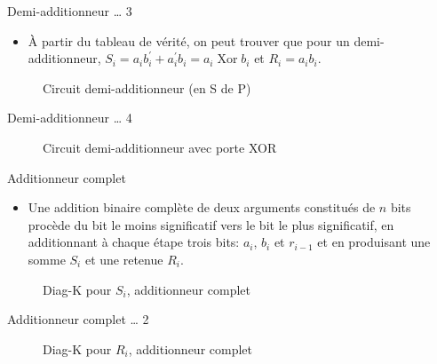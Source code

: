 \documentclass[presentation]{beamer}
\begin{document}
\begin{frame}[label={sec:orgcc94cd7}]{Demi-additionneur \ldots{} 3}
\begin{itemize}
\item À partir du tableau de vérité, on peut trouver que pour un demi-additionneur, \(S_{i} = a_i b_i^\prime + a_i^\prime b_i = a_i \operatorname{Xor} b_i\) et \(R_{i} = a_i b_i\).
\end{itemize}

\begin{figure}[htbp]
\centering

\caption{\label{fig:org5fc7bf9}Circuit demi-additionneur (en S de P)}
\end{figure}
\end{frame}

\begin{frame}[label={sec:orgd9187c1}]{Demi-additionneur \ldots{} 4}
\begin{figure}[htbp]
\centering

\caption{\label{fig:org9df32d8}Circuit demi-additionneur avec porte XOR}
\end{figure}
\end{frame}

\begin{frame}[label={sec:org1e5f91c}]{Additionneur complet}
\begin{itemize}
\item Une addition binaire complète de deux arguments constitués de \(n\) bits procède du bit le moins significatif vers le bit le plus significatif, en additionnant à chaque étape trois bits: \(a_{i}\), \(b_{i}\) et \(r_{i-1}\) et en produisant une somme \(S_{i}\) et une retenue \(R_{i}\).
\end{itemize}


\begin{figure}[htbp]
\centering

\caption{\label{fig:org9a810c7}Diag-K pour \(S_i\), additionneur complet}
\end{figure}
\end{frame}

\begin{frame}[label={sec:orge63d019}]{Additionneur complet \ldots{} 2}
\begin{figure}[htbp]
\centering

\caption{\label{fig:org6bf1560}Diag-K pour \(R_i\), additionneur complet}
\end{figure}
\end{frame}
\end{document}
